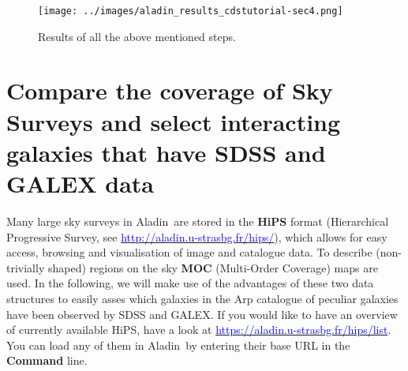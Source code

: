 \documentclass [a4paper, 12pt]{article}
\newcommand{\aladin}{{\textsc{A}{ladin}}}
\begin{document}
\begin{figure}[H]
\center
\texttt{[image: ../images/aladin\_results\_cdstutorial-sec4.png]}
\caption{Results of all the above mentioned steps.}
\label{fig:aladinNGC4039}
\end{figure}


\section{Compare the coverage of Sky Surveys and select interacting 
galaxies that have SDSS and GALEX data}

Many large sky surveys in \aladin\ are stored in the \textbf{HiPS} format
(Hierarchical Progressive Survey, see 
\hyperref[http://aladin.u-strasbg.fr/hips/]{\textcolor{blue}
	{http://aladin.u-strasbg.fr/hips/}}),
which allows for easy access, browsing and visualisation of image and catalogue 
data. To describe (non-trivially shaped) regions on the sky \textbf{MOC} 
(Multi-Order Coverage) maps are used. In the following, we will make use of the 
advantages of these two data structures to easily asses which galaxies in the 
Arp catalogue of peculiar galaxies have been observed by SDSS and GALEX. If you 
would like to have an overview of currently available HiPS, have a look at 
\hyperref[https://aladin.u-strasbg.fr/hips/list]{\textcolor{blue}
	{https://aladin.u-strasbg.fr/hips/list}}. You can load any of them in 
\aladin\ by entering their base URL in the \textbf{Command} line.  
\end{document}
